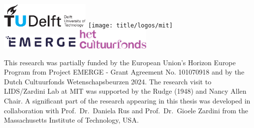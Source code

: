 \begin{titlepage}
\begin{tabular}{p{4.5cm}l}
\end{tabular}



\vspace{-1em}

\begin{center}
    \includegraphics[height=0.5in]{title/logos/tudelft}
    \hspace{3em}
    \texttt{[image: title/logos/mit]}\\
    \vspace{0.5em}
    \includegraphics[height=0.3in]{title/logos/emerge}
    \hspace{3em}
    \includegraphics[height=0.4in]{title/logos/cultuurfonds}
\end{center}
\vfill

\noindent This research was partially funded by the European Union’s Horizon Europe Program from Project EMERGE - Grant Agreement No. 101070918 and by the Dutch Cultuurfonds Wetenschapsbeurzen 2024. The research visit to LIDS/Zardini Lab at MIT was supported by the Rudge (1948) and Nancy Allen Chair.
A significant part of the research appearing in this thesis was developed in collaboration with Prof.\ Dr.\ Daniela Rus and Prof.\ Dr.\ Gioele Zardini from the Massachusetts Institute of Technology, USA.


\end{titlepage}

